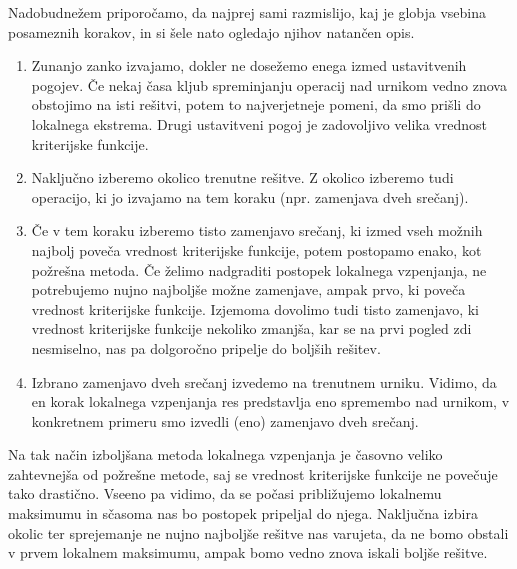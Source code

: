 \documentclass[a4paper,10pt]{article}
\begin{document}
Nadobudnežem priporočamo, da najprej sami razmislijo, kaj je globja vsebina posameznih
korakov, in si šele nato ogledajo njihov natančen opis.

\begin{enumerate}
   \item Zunanjo zanko izvajamo, dokler ne dosežemo enega izmed ustavitvenih pogojev.
   Če nekaj časa kljub spreminjanju operacij nad urnikom vedno znova obstojimo na isti
   rešitvi, potem to najverjetneje pomeni, da smo prišli do lokalnega ekstrema. Drugi
   ustavitveni pogoj je zadovoljivo velika vrednost kriterijske funkcije.

   \item Naključno izberemo okolico trenutne rešitve. Z okolico izberemo tudi operacijo,
   ki jo izvajamo na tem koraku (npr. zamenjava dveh srečanj).

   \item Če v tem koraku izberemo tisto zamenjavo srečanj, ki izmed vseh možnih najbolj
   poveča vrednost kriterijske funkcije, potem postopamo enako, kot požrešna metoda. Če
   želimo nadgraditi postopek lokalnega vzpenjanja, ne potrebujemo nujno najboljše možne
   zamenjave, ampak prvo, ki poveča vrednost kriterijske funkcije. Izjemoma dovolimo tudi
   tisto zamenjavo, ki vrednost kriterijske funkcije nekoliko zmanjša, kar se na prvi
   pogled zdi nesmiselno, nas pa dolgoročno pripelje do boljših rešitev.

   \item Izbrano zamenjavo dveh srečanj izvedemo na trenutnem urniku. Vidimo, da en korak
   lokalnega vzpenjanja res predstavlja eno spremembo nad urnikom, v konkretnem primeru
   smo izvedli (eno) zamenjavo dveh srečanj.
\end{enumerate}
%
Na tak način izboljšana metoda lokalnega vzpenjanja je časovno veliko zahtevnejša od
požrešne metode, saj se vrednost kriterijske funkcije ne povečuje tako drastično. Vseeno
pa vidimo, da se počasi približujemo lokalnemu maksimumu in sčasoma nas bo postopek
pripeljal do njega. Naključna izbira okolic ter sprejemanje ne nujno najboljše rešitve
nas varujeta, da ne bomo obstali v prvem lokalnem maksimumu, ampak bomo vedno znova
iskali boljše rešitve.
\end{document}
